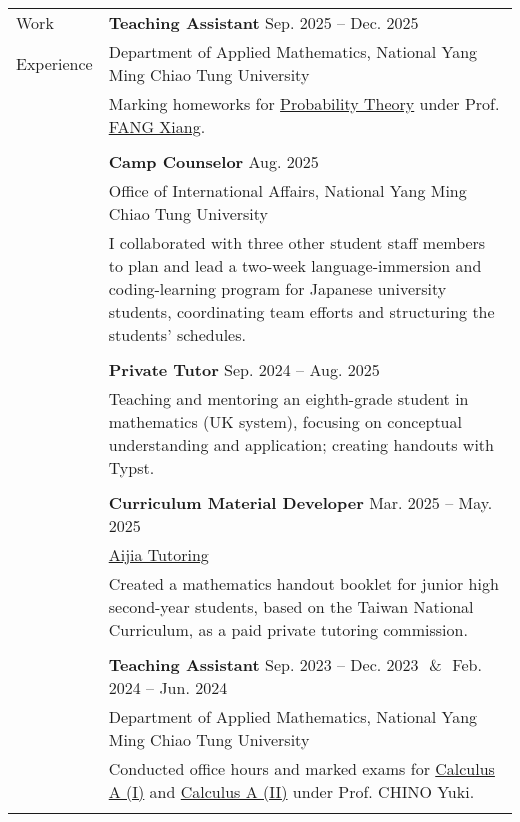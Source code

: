 \documentclass[letterpaper, 11pt]{article}
\begin{document}
\begin{center}
\begin{longtable}{p{0.76in}p{5.93in}}

        {\textcolor{OliveGreen}{Work}} & \textbf{Teaching Assistant}  \hfill Sep. 2025 -- Dec. 2025 \\
        {\textcolor{OliveGreen}{Experience}} & Department of Applied Mathematics, National Yang Ming Chiao Tung University\\
        & Marking homeworks for \href{https://reurl.cc/qYaYr3}{Probability Theory} under Prof. \href{https://www.math.nycu.edu.tw/faculty/e_faculty_content.php?S_ID=149&SC_ID=1}{FANG Xiang}.\\
        & \\

        & \textbf{Camp Counselor} \hfill Aug. 2025 \\
        & Office of International Affairs, National Yang Ming Chiao Tung University \\
        & I collaborated with three other student staff members to plan and lead a two-week language-immersion and coding-learning program for Japanese university students, coordinating team efforts and structuring the students' schedules.\\
        & \\

        & \textbf{Private Tutor} \hfill Sep. 2024 -- Aug. 2025 \\
        & Teaching and mentoring an eighth-grade student in mathematics (UK system), focusing on conceptual understanding and application; creating handouts with Typst.\\
        & \\
        
        & \textbf{Curriculum Material Developer} \hfill Mar. 2025 -- May. 2025 \\
        & \href{https://www.instagram.com/aijiatutoring/}{Aijia Tutoring}\\
        & Created a mathematics handout booklet for junior high second-year students, based on the Taiwan National Curriculum, as a paid private tutoring commission.\\
        & \\

        & \textbf{Teaching Assistant}  \hfill Sep. 2023 -- Dec. 2023\ \,\&\ \,Feb. 2024 -- Jun. 2024 \\
        & Department of Applied Mathematics, National Yang Ming Chiao Tung University\\
        & Conducted office hours and marked exams for \href{https://reurl.cc/Djp5jN}{Calculus A (I)} and \href{https://reurl.cc/RqoMez}{Calculus A (II)} under Prof. CHINO Yuki.\\
        & \\


\end{longtable}
\end{center}
\end{document}
